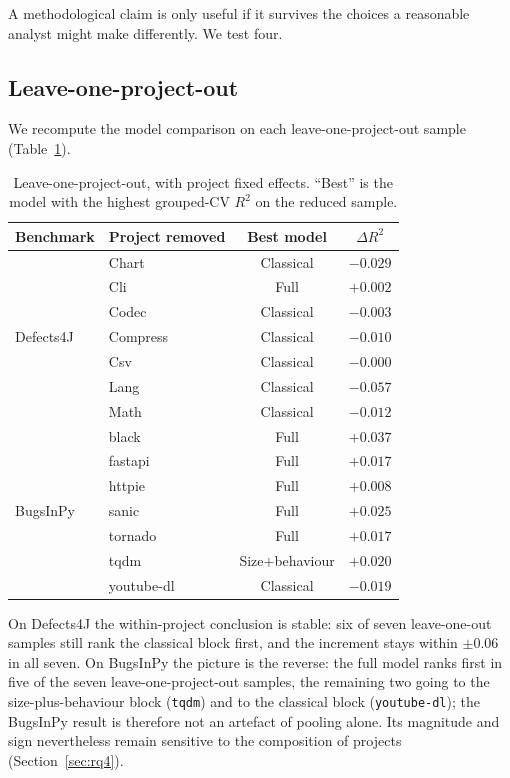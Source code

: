 \documentclass[preprint,12pt]{elsarticle}
\begin{document}
A methodological claim is only useful if it survives the choices a
reasonable analyst might make differently. We test four.

\subsection{Leave-one-project-out}

We recompute the model comparison on each leave-one-project-out sample
(Table~\ref{tab:lopo}).

\begin{table}[t]
\centering
\caption{Leave-one-project-out, with project fixed effects. ``Best'' is the
model with the highest grouped-CV $R^2$ on the reduced sample.}
\label{tab:lopo}
\begin{tabular}{llcc}
\toprule
Benchmark & Project removed & Best model & $\Delta R^2$ \\
\midrule
\multirow{7}{*}{Defects4J}
 & Chart    & Classical & $-0.029$ \\
 & Cli      & Full      & $+0.002$ \\
 & Codec    & Classical & $-0.003$ \\
 & Compress & Classical & $-0.010$ \\
 & Csv      & Classical & $-0.000$ \\
 & Lang     & Classical & $-0.057$ \\
 & Math     & Classical & $-0.012$ \\
\midrule
\multirow{7}{*}{BugsInPy}
 & black      & Full & $+0.037$ \\
 & fastapi    & Full & $+0.017$ \\
 & httpie     & Full & $+0.008$ \\
 & sanic      & Full & $+0.025$ \\
 & tornado    & Full & $+0.017$ \\
 & tqdm       & Size$+$behaviour & $+0.020$ \\
 & youtube-dl & Classical & $-0.019$ \\
\bottomrule
\end{tabular}
\end{table}

On Defects4J the within-project conclusion is stable: six of seven
leave-one-out samples still rank the classical block first, and the
increment stays within $\pm 0.06$ in all seven. On BugsInPy the picture is
the reverse: the full model ranks first in five of the seven
leave-one-project-out samples, the remaining two going to the
size-plus-behaviour block (\texttt{tqdm}) and to the classical block
(\texttt{youtube-dl}); the BugsInPy result is therefore not an artefact of
pooling alone.
Its magnitude and sign nevertheless remain sensitive to the composition of
projects (Section~\ref{sec:rq4}).
\end{document}
